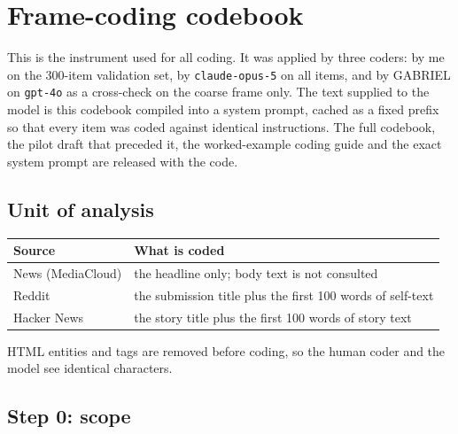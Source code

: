 \section{Frame-coding codebook}
\label{app:codebook}

This is the instrument used for all coding. It was applied by three coders: by
me on the 300-item validation set, by \texttt{claude-opus-5} on all
\Ncoded{} items, and by GABRIEL on \texttt{gpt-4o} as a cross-check on the
coarse frame only. The text supplied to the model is this codebook compiled into
a system prompt, cached as a fixed prefix so that every item was coded against
identical instructions. The full codebook, the pilot draft that preceded it, the
worked-example coding guide and the exact system prompt are released with the
code.

\subsection{Unit of analysis}

\begin{table}[htbp]\centering
\small
\begin{tabular}{ll}
\toprule
Source & What is coded\\
\midrule
News (MediaCloud) & the headline only; body text is not consulted \cite{liu2019}\\
Reddit            & the submission title plus the first 100 words of self-text\\
Hacker News       & the story title plus the first 100 words of story text\\
\bottomrule
\end{tabular}
\end{table}

HTML entities and tags are removed before coding, so the human coder and the
model see identical characters.

\subsection{Step 0: scope}

